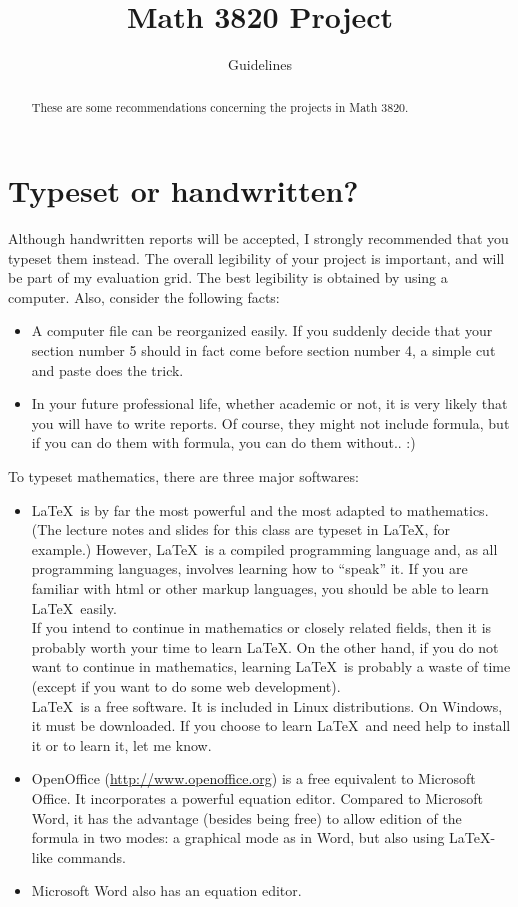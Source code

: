 \documentclass[12pt]{article}
\title{Math 3820 Project}
\author{Guidelines}
\date{}
\begin{document}
\maketitle

\begin{abstract}
These are some recommendations concerning the projects in Math 3820.
\end{abstract}

\section{Typeset or handwritten?}
Although handwritten reports will be accepted, I strongly recommended that you typeset them instead. The overall legibility of your project is important, and will be part of my evaluation grid. The best legibility is obtained by using a computer. Also, consider the following facts:
\begin{itemize}
\item A computer file can be reorganized easily. If you suddenly decide that your section number 5 should in fact come before section number 4, a simple cut and paste does the trick.
\item In your future professional life, whether academic or not, it is very likely that you will have to write reports. Of course, they might not include formula, but if you can do them with formula, you can do them without.. :)
\end{itemize}
To typeset mathematics, there are three major softwares:
\begin{itemize}
\item \LaTeX\ is by far the most powerful and the most adapted to mathematics. (The lecture notes and slides for this class are typeset in \LaTeX, for example.) However, \LaTeX\ is a compiled programming language and, as all programming languages, involves learning how to ``speak'' it. If you are familiar with html or other markup languages, you should be able to learn \LaTeX\ easily.\\
If you intend to continue in mathematics or closely related fields, then it is probably worth your time to learn \LaTeX. On the other hand, if you do not want to continue in mathematics, learning \LaTeX\ is probably a waste of time (except if you want to do some web development).\\
\LaTeX\ is a free software. It is included in Linux distributions. On Windows, it must be downloaded. If you choose to learn \LaTeX\ and need help to install it or to learn it, let me know.
\item OpenOffice (\url{http://www.openoffice.org}) is a free equivalent to Microsoft Office. It incorporates a powerful equation editor. Compared to Microsoft Word, it has the advantage (besides being free) to allow edition of the formula in two modes: a graphical mode as in Word, but also using \LaTeX-like commands.
\item Microsoft Word also has an equation editor.
\end{itemize}
\end{document}
